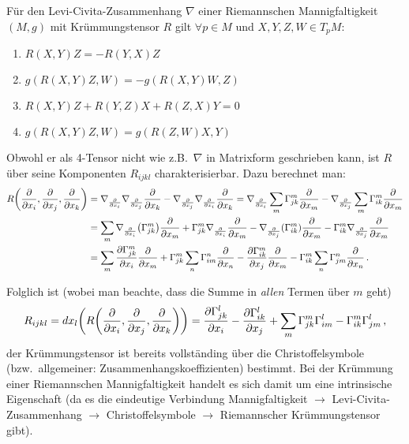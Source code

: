 \documentclass[../H_Analysis_main.tex]{subfiles}
\begin{document}
\begin{satz}
Für den Levi-Civita-Zusammenhang $\nabla$ einer Riemannschen Mannigfaltigkeit $(M, g)$ mit Krümmungstensor $R$ gilt $\forall p \in M$ und $X, Y, Z, W \in T_p M$:
\begin{enumerate}
\item $R(X, Y) Z = - R(Y, X) Z$

\item $g(R(X, Y) Z, W) = - g(R(X, Y) W, Z)$

\item $R(X, Y) Z + R(Y, Z) X + R(Z, X) Y = 0$

\item $g(R(X, Y) Z, W) = g(R(Z, W) X, Y)$
\end{enumerate}
\end{satz}


Obwohl er als 4-Tensor nicht wie z.B.~$\nabla$ in Matrixform geschrieben kann, ist $R$ über seine Komponenten $R_{ijkl}$ charakterisierbar. Dazu berechnet man:
\begin{align*}
R\qty(\pdv{x_i}, \pdv{x_j}, \pdv{x_k}) &= \nabla_{\pdv{x_i}} \nabla_{\pdv{x_j}} \pdv{x_k} - \nabla_{\pdv{x_j}} \nabla_{\pdv{x_i}} \pdv{x_k} = \nabla_{\pdv{x_i}} \sum_m \Gamma_{jk}^m \pdv{x_m} - \nabla_{\pdv{x_j}} \sum_m \Gamma_{ik}^m \pdv{x_m}
\\
&= \sum_m \nabla_{\pdv{x_i}} \qty(\Gamma_{jk}^m) \pdv{x_m} + \Gamma_{jk}^m \nabla_{\pdv{x_i}} \pdv{x_m} - \nabla_{\pdv{x_j}} \qty(\Gamma_{ik}^m) \pdv{x_m} - \Gamma_{ik}^m \nabla_{\pdv{x_j}} \pdv{x_m}
\\
&= \sum_m \pdv{\Gamma_{jk}^m}{x_i} \pdv{x_m} + \Gamma_{jk}^m \sum_n \Gamma_{im}^n \pdv{x_n} - \pdv{\Gamma_{ik}^m}{x_j} \pdv{x_m} - \Gamma_{ik}^m  \sum_n \Gamma_{jm}^n \pdv{x_n} \, .
\end{align*}

Folglich ist (wobei man beachte, dass die Summe in \emph{allen} Termen über $m$ geht)
\begin{equation}
R_{ijkl} = dx_l\qty(R\qty(\pdv{x_i}, \pdv{x_j}, \pdv{x_k})) = \pdv{\Gamma_{jk}^l}{x_i} - \pdv{\Gamma_{ik}^l}{x_j} + \sum_m \Gamma_{jk}^m \Gamma_{im}^l - \Gamma_{ik}^m \Gamma_{jm}^l \, ,
\end{equation}
der Krümmungstensor ist bereits vollständing über die Christoffelsymbole (bzw.~allgemeiner: Zusammenhangskoeffizienten) bestimmt. Bei der Krümmung einer Riemannschen Mannigfaltigkeit handelt es sich damit um eine intrinsische Eigenschaft (da es die eindeutige Verbindung Mannigfaltigkeit $\rightarrow$ Levi-Civita-Zusammenhang $\rightarrow$ Christoffelsymbole $\rightarrow$ Riemannscher Krümmungstensor gibt).\\
\end{document}
